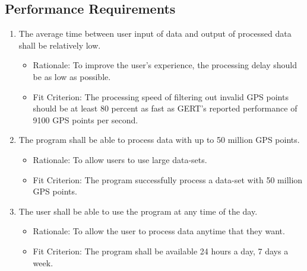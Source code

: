 \documentclass[12pt, titlepage]{article}
\begin{document}
\subsection{Performance Requirements}
\begin{enumerate}[{PR}1. ]
\item \label{PR1} The average time between user input of data and output of processed data shall be relatively low.
    \begin{itemize} 
        \item Rationale: To improve the user's experience, the processing delay should be as low as possible.
        \item Fit Criterion: The processing speed of filtering out invalid GPS points should be at least 80 percent as fast as GERT's reported performance of 9100 GPS points per second.
    \end{itemize} 
    
\item \label{PR2} The program shall be able to process data with up to 50 million GPS points.
    \begin{itemize} 
        \item Rationale: To allow users to use large data-sets.
        \item Fit Criterion: The program successfully process a data-set with 50 million GPS points.
    \end{itemize} 

\item \label{PR3} The user shall be able to use the program at any time of the day.
    \begin{itemize} 
        \item Rationale: To allow the user to process data anytime that they want.
        \item Fit Criterion: The program shall be available 24 hours a day, 7 days a week.
    \end{itemize} 

\end{enumerate}
\end{document}
